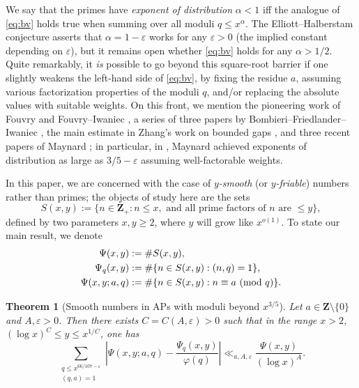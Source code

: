 \documentclass[reqno,11pt]{amsart}
\newtheorem{theorem}{Theorem}[section]
\theoremstyle{definition}
\theoremstyle{remark}
\numberwithin{equation}{section}
\newcommand{\Z}{\mathbf{Z}}
\newcommand{\eps}{\varepsilon}
\renewcommand{\pmod}[1]{\ (\textnormal{mod } #1)}
\begin{document}
We say that the primes have \emph{exponent of distribution} $\alpha < 1$ iff the analogue of \cref{eq:bv} holds true when summing over all moduli $q \le x^\alpha$. The Elliott--Halberstam conjecture \cite{elliott1968conjecture} asserts that $\alpha = 1 - \eps$ works for any $\eps > 0$ (the implied constant depending on $\eps$), but it remains open whether \cref{eq:bv} holds for any $\alpha > 1/2$. Quite remarkably, it \emph{is} possible to go beyond this square-root barrier if one slightly weakens the left-hand side of \cref{eq:bv}, by fixing the residue $a$, assuming various factorization properties of the moduli $q$, and/or replacing the absolute values with suitable weights. On this front, we mention the pioneering work of Fouvry \cite{fouvry1984autour,fouvry1987autour,fouvry1985probleme,fouvry1982repartition} and Fouvry--Iwaniec \cite{fouvry1980theorem,fouvry1983primes}, a series of three papers by Bombieri--Friedlander--Iwaniec \cite{bombieri1986primes,bombieri1987primes2,bombieri1989primes3}, the main estimate in Zhang's work on bounded gaps \cite{zhang2014bounded}, and three recent papers of Maynard \cite{maynard2020primes,maynard2020primesII,maynard2020primesIII}; in particular, in \cite{maynard2020primesII}, Maynard achieved exponents of distribution as large as $3/5-\eps$ assuming well-factorable weights.

In this paper, we are concerned with the case of \emph{$y$-smooth} (or \emph{$y$-friable}) numbers rather than primes; the objects of study here are the sets
\[
    S(x, y) := \{n \in \Z_+ : n \le x, \text{ and all prime factors of $n$ are $\le y$}\},
\]
defined by two parameters $x, y \ge 2$, where $y$ will grow like $x^{o(1)}$. To state our main result, we denote
\[
\begin{aligned}
    \Psi(x, y) &:= \# S(x, y), \\
    \Psi_q(x, y) &:= \# \{n \in S(x, y) : (n, q) = 1\}, \\
    \Psi(x, y; a, q) &:= \# \{n \in S(x, y) : n \equiv a \pmod{q}\}.
\end{aligned}
\]
\begin{theorem}[Smooth numbers in APs with moduli beyond $x^{3/5}$] \label{thm:distribution-simplified}
Let $a \in \Z \setminus \{0\}$ and $A, \eps > 0$. Then there exists $C = C(A, \eps) > 0$ such that in the range $x > 2$, $(\log x)^C \le y \le x^{1/C}$, one has
\[
    \sum_{\substack{q \le x^{66/107-\eps} \\ (q, a) = 1}} 
    \left\vert \Psi(x, y; a, q) - \frac{\Psi_q(x, y)}{\varphi(q)}
    \right\vert 
    \ll_{a, A, \eps} 
    \frac{\Psi(x, y)}{(\log x)^A}.
\]
\end{theorem}
\end{document}
